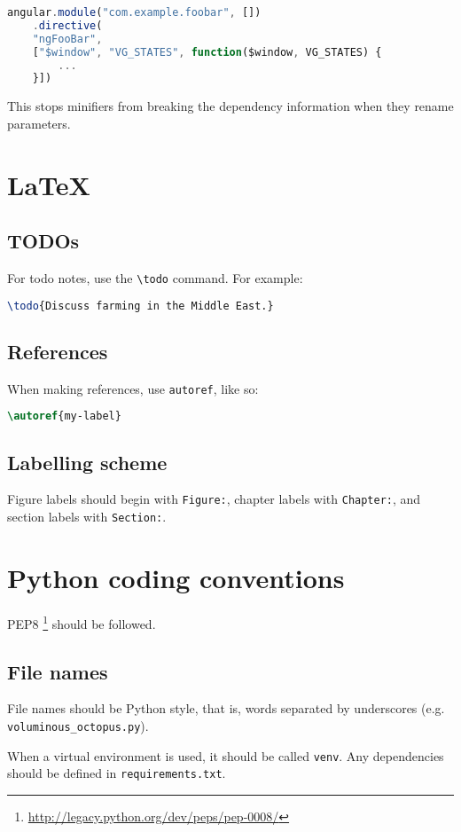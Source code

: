 \begin{lstlisting}[language=javascript]
angular.module("com.example.foobar", [])
    .directive(
    "ngFooBar",
    ["$window", "VG_STATES", function($window, VG_STATES) {
        ...
    }])
\end{lstlisting}

This stops minifiers from breaking the dependency information when they
rename parameters.

\section{LaTeX}

\subsection{TODOs}

For todo notes, use the \texttt{\textbackslash{}todo} command. For
example:

\begin{lstlisting}[language=tex]
\todo{Discuss farming in the Middle East.}
\end{lstlisting}

\subsection{References}

When making references, use \texttt{autoref}, like so:

\begin{lstlisting}[language=tex]
\autoref{my-label}
\end{lstlisting}

\subsection{Labelling scheme}

Figure labels should begin with \texttt{Figure:}, chapter labels with
\texttt{Chapter:}, and section labels with \texttt{Section:}.

\section{Python coding conventions}

PEP8 \footnote{\url{http://legacy.python.org/dev/peps/pep-0008/}} should be
followed.

\subsection{File names}

File names should be Python style, that is, words separated by
underscores (e.g. \texttt{voluminous\_octopus.py}).

When a virtual environment is used, it should be called \texttt{venv}.
Any dependencies should be defined in \texttt{requirements.txt}.
